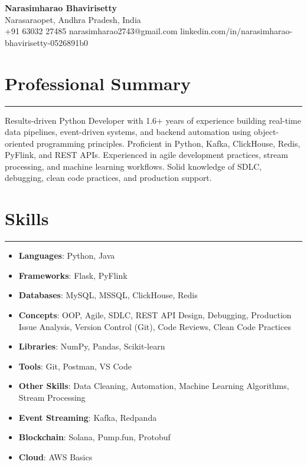 \documentclass[12pt]{article}
\begin{document}
\begin{center}
  {\huge\textbf{Narasimharao Bhavirisetty}}\\[3pt]
  Narasaraopet, Andhra Pradesh, India \\[1pt]
  +91 63032 27485 \textbullet{} narasimharao2743@gmail.com \textbullet{}
  linkedin.com/in/narasimharao-bhavirisetty-0526891b0
\end{center}

\vspace{6pt}

\section*{Professional Summary}
\vspace{1pt}\hrule\vspace{4pt}
Results-driven Python Developer with 1.6+ years of experience building real-time data pipelines, event-driven systems, and backend automation using object-oriented programming principles. Proficient in Python, Kafka, ClickHouse, Redis, PyFlink, and REST APIs. Experienced in agile development practices, stream processing, and machine learning workflows. Solid knowledge of SDLC, debugging, clean code practices, and production support.

\section*{Skills}
\vspace{1pt}\hrule\vspace{4pt}
\begin{itemize}
  \item \textbf{Languages}: Python, Java
  \item \textbf{Frameworks}: Flask, PyFlink
  \item \textbf{Databases}: MySQL, MSSQL, ClickHouse, Redis
  \item \textbf{Concepts}: OOP, Agile, SDLC, REST API Design, Debugging, Production Issue Analysis, Version Control (Git), Code Reviews, Clean Code Practices
  \item \textbf{Libraries}: NumPy, Pandas, Scikit-learn
  \item \textbf{Tools}: Git, Postman, VS Code
  \item \textbf{Other Skills}: Data Cleaning, Automation, Machine Learning Algorithms, Stream Processing
  \item \textbf{Event Streaming}: Kafka, Redpanda
  \item \textbf{Blockchain}: Solana, Pump.fun, Protobuf
  \item \textbf{Cloud}: AWS Basics
\end{itemize}
\end{document}

